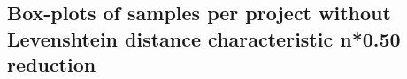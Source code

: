 \begin{appendices}
\chapter{Box-plots of samples per project without Levenshtein distance characteristic n*0.50 reduction}
\label{ap:no_distance_50}
\begin{figure}[h]
    \centering
    \qquad
\end{figure}


\end{appendices}
